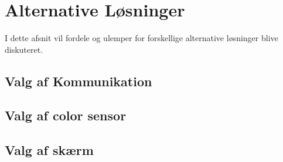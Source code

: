 \graphicspath{{Chapters/Alternative_Loesninger/}}


\section{Alternative Løsninger}
I dette afsnit vil fordele og ulemper for forskellige alternative løsninger blive diskuteret.


\subsection{Valg af Kommunikation}


\subsection{Valg af color sensor}


\subsection{Valg af skærm}